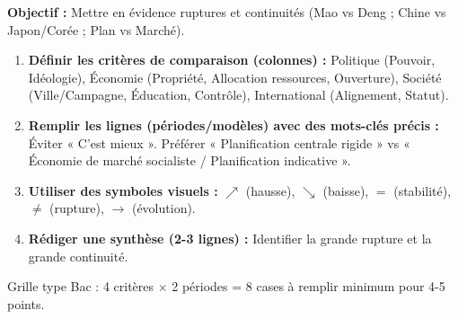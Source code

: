 \documentclass[11pt]{article}
\newcommand{\cle}[1]{{\popxbold\color{popdark}#1}}
\begin{document}
\begin{methode}
\textbf{Objectif :} Mettre en évidence ruptures et continuités (Mao vs Deng ; Chine vs Japon/Corée ; Plan vs Marché).
\begin{enumerate}
    \item \textbf{Définir les critères de comparaison (colonnes) :} Politique (Pouvoir, Idéologie), Économie (Propriété, Allocation ressources, Ouverture), Société (Ville/Campagne, Éducation, Contrôle), International (Alignement, Statut).
    \item \textbf{Remplir les lignes (périodes/modèles) avec des mots-clés précis :} Éviter « C'est mieux ». Préférer « Planification centrale rigide » vs « Économie de marché socialiste / Planification indicative ».
    \item \textbf{Utiliser des symboles visuels :} $\nearrow$ (hausse), $\searrow$ (baisse), $=$ (stabilité), $\neq$ (rupture), $\rightarrow$ (évolution).
    \item \textbf{Rédiger une synthèse (2-3 lignes) :} Identifier la \cle{grande rupture} et la \cle{grande continuité}.
\end{enumerate}
\cle{Grille type Bac :} 4 critères $\times$ 2 périodes = 8 cases à remplir minimum pour 4-5 points.
\end{methode}
\end{document}
